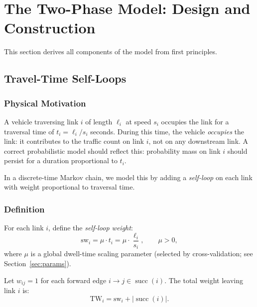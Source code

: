 \documentclass[12pt,a4paper]{article}
\theoremstyle{definition}
\theoremstyle{plain}
\newcommand{\sw}{\mathrm{sw}}
\newcommand{\TW}{\mathrm{TW}}
\begin{document}
\section{The Two-Phase Model: Design and Construction}
\label{sec:model}

This section derives all components of the model from first principles.

\subsection{Travel-Time Self-Loops}
\label{sec:selfloop}

\subsubsection{Physical Motivation}

A vehicle traversing link $i$ of length $\ell_i$ at speed $s_i$ occupies the link for
a traversal time of $t_i = \ell_i / s_i$ seconds. During this time, the vehicle
\emph{occupies} the link: it contributes to the traffic count on link $i$, not on any
downstream link. A correct probabilistic model should reflect this: probability mass
on link $i$ should persist for a duration proportional to $t_i$.

In a discrete-time Markov chain, we model this by adding a \emph{self-loop} on each
link with weight proportional to traversal time.

\subsubsection{Definition}

For each link $i$, define the \emph{self-loop weight}:
\begin{equation}
  \boxed{\sw_i = \mu \cdot t_i = \mu \cdot \frac{\ell_i}{s_i}}, \qquad \mu > 0,
  \label{eq:selfloop}
\end{equation}
where $\mu$ is a global dwell-time scaling parameter (selected by cross-validation;
see Section~\ref{sec:params}).

Let $w_{ij} = 1$ for each forward edge $i \to j \in \operatorname{succ}(i)$. The total
weight leaving link $i$ is:
\[
  \TW_i = \sw_i + |\operatorname{succ}(i)|.
\]
\end{document}
